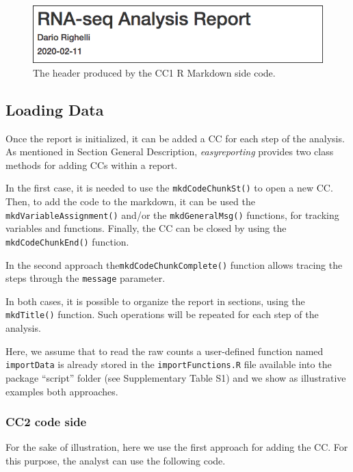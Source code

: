 \documentclass[]{article}
\begin{document}
\begin{figure}
\centering
\includegraphics{imgs/1.png}
\caption{The header produced by the CC1 R Markdown side code.}
\end{figure}

\hypertarget{loading-data}{%
\subsection{Loading Data}\label{loading-data}}

Once the report is initialized, it can be added a CC for each step of
the analysis. As mentioned in Section General Description,
\emph{easyreporting} provides two class methods for adding CCs within a
report.

In the first case, it is needed to use the \texttt{mkdCodeChunkSt()} to
open a new CC. Then, to add the code to the markdown, it can be used the
\texttt{mkdVariableAssignment()} and/or the \texttt{mkdGeneralMsg()}
functions, for tracking variables and functions. Finally, the CC can be
closed by using the \texttt{mkdCodeChunkEnd()} function.

In the second approach the\texttt{mkdCodeChunkComplete()} function
allows tracing the steps through the \texttt{message} parameter.

In both cases, it is possible to organize the report in sections, using
the \texttt{mkdTitle()} function. Such operations will be repeated for
each step of the analysis.

Here, we assume that to read the raw counts a user-defined function
named \texttt{importData} is already stored in the
\texttt{importFunctions.R} file available into the package ``script''
folder (see Supplementary Table S1) and we show as illustrative examples
both approaches.

\hypertarget{cc2-code-side}{%
\subsubsection{CC2 code side}\label{cc2-code-side}}

For the sake of illustration, here we use the first approach for adding
the CC. For this purpose, the analyst can use the following code.
\end{document}
